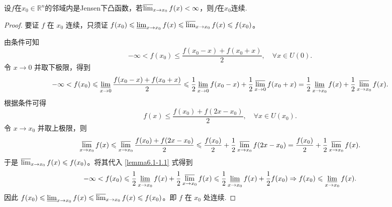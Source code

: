 \documentclass[../../main.tex]{subfiles}
\begin{document}
\begin{lemma}\label{lemma:关于Jesen下凸与连续的引理}
设\(f\)在\(x_0\in\mathbb{R}^n\)的邻域内是Jensen下凸函数，若\(\varlimsup_{x\rightarrow x_0}f(x)<\infty\)，则\(f\)在\(x_0\)连续.
\end{lemma}
\begin{proof}
要证 \(f\) 在 \(x_0\) 连续，只须证 \(f(x_0) \leqslant \varliminf_{x \to x_0} f(x) \leqslant \varlimsup_{x \to x_0} f(x) \leqslant f(x_0)\)。

由条件可知
\[
-\infty < f(x_0) \leqslant \frac{f(x_0 - x) + f(x_0 + x)}{2}, \quad \forall x \in U(0).
\]
令 \(x \to 0\) 并取下极限，得到
\begin{align}
-\infty < f(x_0) \leqslant \varliminf_{x \to 0} \frac{f(x_0 - x) + f(x_0 + x)}{2} 
\leqslant \frac{1}{2} \varliminf_{x \to 0} f(x_0 - x) + \frac{1}{2} \varlimsup_{x \to 0} f(x_0 + x) 
= \frac{1}{2} \varliminf_{x \to x_0} f(x) + \frac{1}{2} \varlimsup_{x \to x_0} f(x). \label{lemma6.1-1.1}
\end{align}
根据条件可得
\[
f(x) \leqslant \frac{f(x_0) + f(2x - x_0)}{2}, \quad \forall x \in U(x_0).
\]
令 \(x \to x_0\) 并取上极限，则
\begin{align*}
\varlimsup_{x \to x_0} f(x)\leqslant \varlimsup_{x \to x_0} \frac{f(x_0) + f(2x - x_0)}{2} 
\leqslant \frac{f(x_0)}{2} + \frac{1}{2} \varlimsup_{x \to x_0} f(2x - x_0) 
= \frac{f(x_0)}{2} + \frac{1}{2} \varlimsup_{x \to x_0} f(x).
\end{align*}
于是 \(\varlimsup_{x \to x_0} f(x) \leqslant f(x_0)\)。将其代入 \eqref{lemma6.1-1.1} 式得到
\begin{align*}
-\infty < f(x_0) \leqslant \frac{1}{2} \varliminf_{x \to x_0} f(x) + \frac{1}{2} \varlimsup_{x \to x_0} f(x) 
\leqslant \frac{1}{2} \varliminf_{x \to x_0} f(x) + \frac{1}{2} f(x_0) 
\Rightarrow f(x_0) \leqslant \varliminf_{x \to x_0} f(x).
\end{align*}
因此 \(f(x_0) \leqslant \varliminf_{x \to x_0} f(x) \leqslant \varlimsup_{x \to x_0} f(x) \leqslant f(x_0)\)。即 \(f\) 在 \(x_0\) 处连续.
\end{proof}
\end{document}
